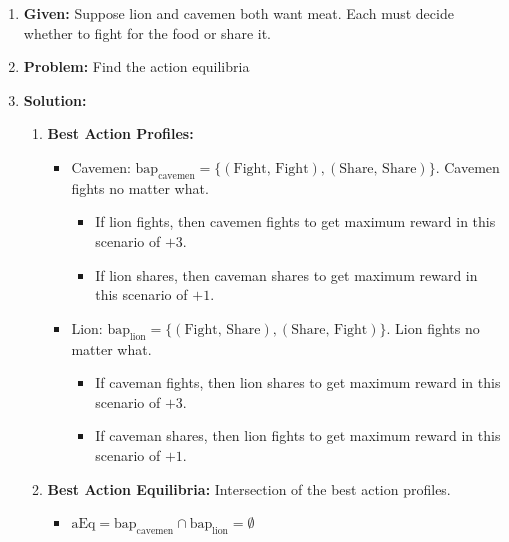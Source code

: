\begin{example}
    \begin{enumerate}
        \item \textbf{Given:} Suppose lion and cavemen both want meat. Each must decide whether to fight for the food or share it. 
        \vspace{-1em}
        \item \textbf{Problem:} Find the action equilibria 
        \item \textbf{Solution:}
        \begin{enumerate}
            \item \textbf{Best Action Profiles:}
            \begin{itemize}
                \item Cavemen: $\text{bap}_{\text{cavemen}} = \{(\text{Fight, Fight}), (\text{Share, Share})\}$. Cavemen fights no matter what. 
                \begin{itemize}
                    \item If lion fights, then cavemen fights to get maximum reward in this scenario of $+3$. 
                    \item If lion shares, then caveman shares to get maximum reward in this scenario of $+1$.
                \end{itemize}
                \item Lion: $\text{bap}_{\text{lion}} = \{(\text{Fight, Share}), (\text{Share, Fight})\}$. Lion fights no matter what.
                \begin{itemize}
                    \item If caveman fights, then lion shares to get maximum reward in this scenario of $+3$.
                    \item If caveman shares, then lion fights to get maximum reward in this scenario of $+1$.
                \end{itemize}
            \end{itemize}
            \item \textbf{Best Action Equilibria:} Intersection of the best action profiles.
            \begin{itemize}
                \item $\text{aEq} = \text{bap}_{\text{cavemen}} \cap \text{bap}_{\text{lion}} = \emptyset$
            \end{itemize}
        \end{enumerate}
    \end{enumerate}
\end{example}
\newpage

